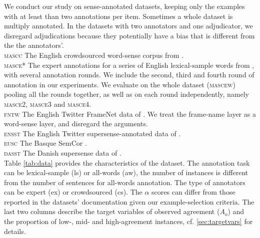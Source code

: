\documentclass[11pt,a4paper]{article}
\begin{document}
We conduct our study on sense-annotated datasets, keeping only the examples with at least than two annotations per item. Sometimes a whole dataset is multiply annotated. In the datasets with two annotators and one adjudicator, we disregard adjudications because they potentially have a bias that is different from the the annotators'.\\
\noindent\textsc{mascc} The English crowdsourced word-sense corpus from .\\
\textsc{masce*} The expert annotations for a series of English lexical-sample words from , with several annotation rounds. We include the second, third and fourth round of annotation in our experiments. We evaluate on the whole dataset (\textsc{mascew}) pooling all the rounds together, as well as on each round independently, namely \textsc{masce2}, \textsc{masce3} and \textsc{masce4}.\\
\textsc{fntw} The English Twitter FrameNet data of . We treat the frame-name layer as a word-sense layer, and disregard the arguments.\\
\textsc{ensst} The English Twitter supersense-annotated data of .\\
\textsc{eusc} The Basque SemCor \cite{Agirre2006}.\\
\textsc{dasst} The Danish supersense data of \cite{MartinezAlonso2015}.\\
Table \ref{tab:data} provides the characteristics of the dataset. The annotation task can be lexical-sample (ls) or all-words (aw), the number of instances is different from the number of sentences for all-words annotation. The type of annotators can be expert (ex) or crowdsourced (cs). The $\alpha$ scores can differ from those reported in the datasets' documentation given our example-selection criteria. The last two columns describe the target variables of observed agreement ($A_o$) and the proportion of low-, mid- and high-agreement instances, cf. \ref{sec:targetvars} for details.
\end{document}
